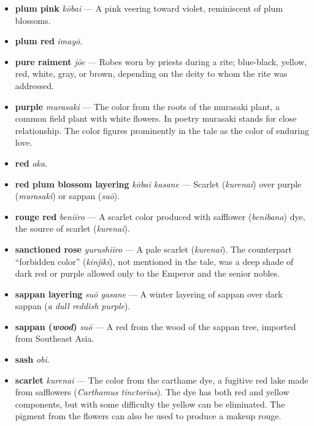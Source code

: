 \documentclass{article}
\begin{document}
\begin{multicols*}{2}
\begin{itemize}[
			label=,
			leftmargin=0em,
			rightmargin=-1.5em,
			itemindent=-2em,
			nosep,
		]
		\item \textbf{plum pink} \textit{kōbai} --- A pink veering toward violet, reminiscent of plum blossoms.

		\item \textbf{plum red} \textit{imayō}.

		\item \textbf{pure raiment} \textit{jōe} --- Robes worn by priests during a rite; blue-black, yellow, red, white, gray, or brown, depending on the deity to whom the rite was addressed.

		\item \textbf{purple} \textit{murasaki} --- The color from the roots of the murasaki plant, a common field plant with white flowers. In poetry murasaki stands for close relationship. The color figures prominently in the tale as the color of enduring love.

		\item \textbf{red} \textit{aka}.

		\item \textbf{red plum blossom layering} \textit{kōbai kasane} --- Scarlet (\textit{kurenai}) over purple (\textit{murasaki}) or sappan (\textit{suō}).

		\item \textbf{rouge red} \textit{beniiro} --- A scarlet color produced with safflower (\textit{benibana}) dye, the source of scarlet (\textit{kurenai}).

		\item \textbf{sanctioned rose} \textit{yurushiiro} --- A pale scarlet (\textit{kurenai}). The counterpart “forbidden color” (\textit{kinjiki}), not mentioned in the tale, was a deep shade of dark red or purple allowed only to the Emperor and the senior nobles.

		\item \textbf{sappan layering} \textit{suō gasane} --- A winter layering of sappan over dark sappan (\textit{a dull reddish purple}).

		\item \textbf{sappan (\textit{wood})} \textit{suō} --- A red from the wood of the sappan tree, imported from Southeast Asia.

		\item \textbf{sash} \textit{obi}.

		\item \textbf{scarlet} \textit{kurenai} --- The color from the carthame dye, a fugitive red lake made from safflowers (\textit{Carthamus tinctorius}). The dye has both red and yellow components, but with some difficulty the yellow can be eliminated. The pigment from the flowers can also be used to produce a makeup rouge.


\end{itemize}
\end{multicols*}
\end{document}
